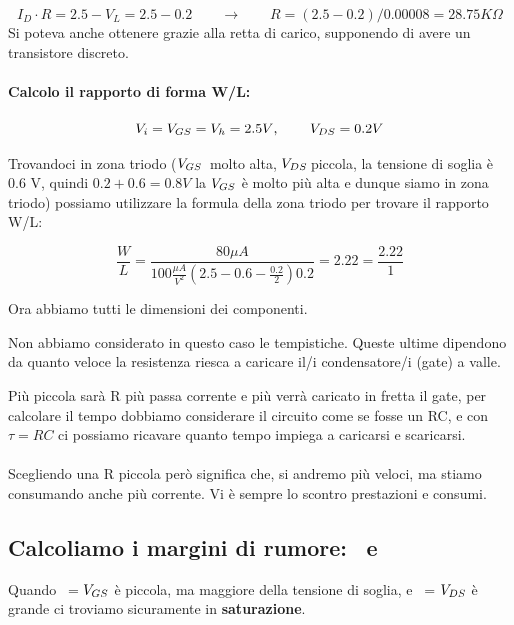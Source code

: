 \begin{equation*}
    I_D \cdot R = 2.5 - V_L = 2.5 - 0.2 \qquad \longrightarrow \qquad R = (2.5 - 0.2 ) / 0.00008 = 28.75 K\Omega
\end{equation*}
Si poteva anche ottenere grazie alla retta di carico, supponendo di avere un transistore discreto.

\paragraph{Calcolo il rapporto di forma W/L:}

\begin{equation*}
    V_i = V_{GS} = V_h = 2.5 V \text{,  } \qquad V_{DS} = 0.2V
\end{equation*}

Trovandoci in zona triodo ($V_{GS}\,$ molto alta, $V_{DS}\,$piccola, la tensione di soglia è 0.6 V, quindi $0.2 + 0.6 = 0.8V$ la $V_{GS}$ è molto più alta e dunque siamo in zona triodo) possiamo utilizzare la formula della zona triodo per trovare il rapporto W/L:

\begin{equation*}
    \frac{W}{L} = \frac{80 \mu A}{100 \frac{\mu A}{V^2} (2.5-0.6-\frac{0.2}{2})0.2} = 2.22 = \frac{2.22}{1}
\end{equation*}

Ora abbiamo tutti le dimensioni dei componenti. 

Non abbiamo considerato in questo caso le tempistiche. Queste ultime dipendono da quanto veloce la resistenza riesca a caricare il/i condensatore/i (gate) a valle.

Più piccola sarà R  più passa corrente e più verrà caricato in fretta il gate, per calcolare il tempo dobbiamo considerare il circuito come se fosse un RC, e con $\tau = RC$ ci possiamo ricavare quanto tempo impiega a caricarsi e scaricarsi.
\paragraph{}
Scegliendo una R piccola però significa che, si andremo più veloci, ma stiamo consumando anche più corrente. Vi è sempre lo scontro prestazioni e consumi.


\subsection{Calcoliamo i margini di rumore: \vil $\,$ e \voh}
Quando \vi $\,$ = $V_{GS}$ è piccola, ma maggiore della tensione di soglia, e \vo $\,$ = $V_{DS}$ è grande ci troviamo sicuramente in \textbf{saturazione}.

